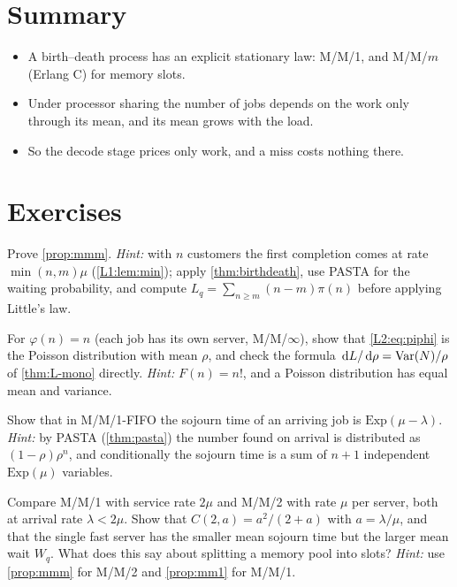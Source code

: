 \section{Summary}
\begin{itemize}
\item A birth--death process has an explicit stationary law: M/M/1, and M/M/$m$ (Erlang C) for memory slots.
\item Under processor sharing the number of jobs depends on the work only through its mean, and its mean grows with the load.
\item So the decode stage prices only work, and a miss costs nothing there.
\end{itemize}

\section{Exercises}

\begin{exercise}\label{L2:ex:erlang}
Prove \cref{prop:mmm}.
\emph{Hint:} with $n$ customers the first completion comes at rate $\min(n,m)\mu$
(\cref{L1:lem:min}); apply \cref{thm:birthdeath}, use PASTA for the waiting probability,
and compute $L_q=\sum_{n\ge m}(n-m)\pi(n)$ before applying Little's law.
\end{exercise}

\begin{exercise}\label{L2:ex:mminf}
For $\varphi(n)=n$ (each job has its own server, M/M/$\infty$), show that
\eqref{L2:eq:piphi} is the Poisson distribution with mean $\rho$, and check the formula
$\,\mathrm{d} L/\,\mathrm{d}\rho=\operatorname{Var}(N)/\rho$ of \cref{thm:L-mono} directly.
\emph{Hint:} $F(n)=n!$, and a Poisson distribution has equal mean and variance.
\end{exercise}

\begin{exercise}\label{L2:ex:mm1wait}
Show that in M/M/1-FIFO the sojourn time of an arriving job is $\mathrm{Exp}(\mu-\lambda)$.
\emph{Hint:} by PASTA (\cref{thm:pasta}) the number found on arrival is distributed as
$(1-\rho)\rho^n$, and conditionally the sojourn time is a sum of $n+1$ independent
$\mathrm{Exp}(\mu)$ variables.
\end{exercise}

\begin{exercise}\label{L2:ex:mmm}
Compare M/M/1 with service rate $2\mu$ and M/M/2 with rate $\mu$ per server, both at
arrival rate $\lambda<2\mu$. Show that $C(2,a)=a^2/(2+a)$ with $a=\lambda/\mu$, and
that the single fast server has the smaller mean sojourn time but the larger
mean wait $W_q$. What does this say about splitting a memory pool into slots?
\emph{Hint:} use \cref{prop:mmm} for M/M/2 and \cref{prop:mm1} for M/M/1.
\end{exercise}
